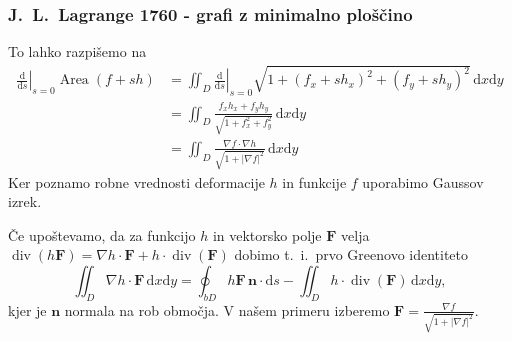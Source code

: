 \documentclass[8pt]{beamer}
\theoremstyle{definition}
\theoremstyle{remark}
\theoremstyle{plain}
\numberwithin{equation}{section}  %
\begin{document}
\begin{frame}
    \frametitle{J.~L.~Lagrange 1760 - grafi z minimalno ploščino}

    To lahko razpišemo na
    \begin{align*}
        \left.\frac{\mathrm{d}}{\mathrm{d} s}\right|_{s=0} \operatorname{Area}(f+s h) & =\left.\iint_{D} \frac{\mathrm{d}}{\mathrm{d} s}\right|_{s=0} \sqrt{1+\left(f_x+s h_x\right)^2+\left(f_y+s h_y\right)^2} \, \mathrm{d} x \mathrm{d} y \\
        & =\iint_{D} \frac{f_x h_x+f_y h_y}{\sqrt{1+f_x^2+f_y^2}} \, \mathrm{d} x \mathrm{d} y \\
        & =\iint_{D} \frac{\nabla f \cdot \nabla h}{\sqrt{1+|\nabla f|^2}} \, \mathrm{d} x \mathrm{d} y
    \end{align*}
    \pause
    Ker poznamo robne vrednosti deformacije $h$ in funkcije $f$ uporabimo Gaussov izrek. 
    \pause
    \vspace{0.8em}

    Če upoštevamo, da za funkcijo $h$ in vektorsko polje $\mathbf{F}$ velja $\operatorname{div}(h \mathbf{F})=\nabla h \cdot \mathbf{F}+h \cdot \operatorname{div}(\mathbf{F})$ dobimo t.~i.~prvo Greenovo identiteto
    \begin{equation*}
        \iint_{D} \nabla h \cdot \mathbf{F} \, \mathrm{d} x \mathrm{d} y=\oint_{b D} h \mathbf{F} \, \mathbf{n} \cdot \mathrm{d} s-\iint_{D} h \cdot \operatorname{div}(\mathbf{F}) \, \mathrm{d} x \mathrm{d} y,
    \end{equation*}
    kjer je $\mathbf{n}$ normala na rob območja. V našem primeru izberemo $\mathbf{F}=\frac{\nabla f}{\sqrt{1+|\nabla f|^2}}$.

\end{frame}
\end{document}
